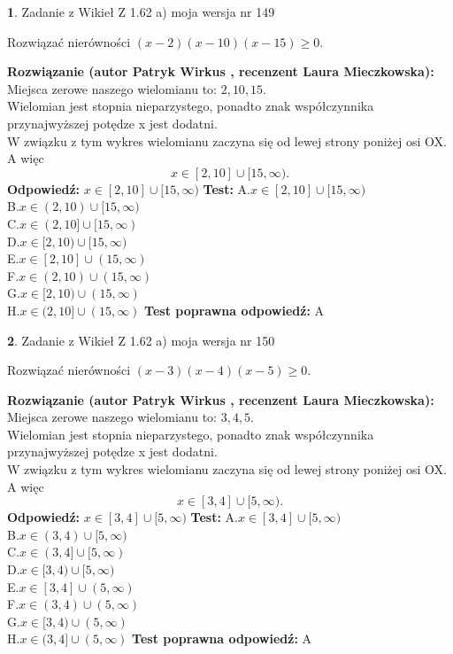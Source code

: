 \documentclass[12pt, a4paper]{article}
\theoremstyle{definition} %
\newtheorem{zad}{}
\newcommand{\zadStart}[1]{\begin{zad}#1\newline}
\newcommand{\zadStop}{\end{zad}}
\newcommand{\rozwStart}[2]{\noindent \textbf{Rozwiązanie (autor #1 , recenzent #2): }\newline}
\newcommand{\rozwStop}{\newline}
\newcommand{\odpStart}{\noindent \textbf{Odpowiedź:}\newline}
\newcommand{\odpStop}{\newline}
\newcommand{\testStart}{\noindent \textbf{Test:}\newline}
\newcommand{\testStop}{\newline}
\newcommand{\kluczStart}{\noindent \textbf{Test poprawna odpowiedź:}\newline}
\newcommand{\kluczStop}{\newline}
\begin{document}
\zadStart{Zadanie z Wikieł Z 1.62 a) moja wersja nr 149}

Rozwiązać nierówności $(x-2)(x-10)(x-15)\ge0$.
\zadStop
\rozwStart{Patryk Wirkus}{Laura Mieczkowska}
Miejsca zerowe naszego wielomianu to: $2, 10, 15$.\\
Wielomian jest stopnia nieparzystego, ponadto znak współczynnika przy\linebreak najwyższej potędze x jest dodatni.\\ W związku z tym wykres wielomianu zaczyna się od lewej strony poniżej osi OX. A więc $$x \in [2,10] \cup [15,\infty).$$
\rozwStop
\odpStart
$x \in [2,10] \cup [15,\infty)$
\odpStop
\testStart
A.$x \in [2,10] \cup [15,\infty)$\\
B.$x \in (2,10) \cup [15,\infty)$\\
C.$x \in (2,10] \cup [15,\infty)$\\
D.$x \in [2,10) \cup [15,\infty)$\\
E.$x \in [2,10] \cup (15,\infty)$\\
F.$x \in (2,10) \cup (15,\infty)$\\
G.$x \in [2,10) \cup (15,\infty)$\\
H.$x \in (2,10] \cup (15,\infty)$
\testStop
\kluczStart
A
\kluczStop



\zadStart{Zadanie z Wikieł Z 1.62 a) moja wersja nr 150}

Rozwiązać nierówności $(x-3)(x-4)(x-5)\ge0$.
\zadStop
\rozwStart{Patryk Wirkus}{Laura Mieczkowska}
Miejsca zerowe naszego wielomianu to: $3, 4, 5$.\\
Wielomian jest stopnia nieparzystego, ponadto znak współczynnika przy\linebreak najwyższej potędze x jest dodatni.\\ W związku z tym wykres wielomianu zaczyna się od lewej strony poniżej osi OX. A więc $$x \in [3,4] \cup [5,\infty).$$
\rozwStop
\odpStart
$x \in [3,4] \cup [5,\infty)$
\odpStop
\testStart
A.$x \in [3,4] \cup [5,\infty)$\\
B.$x \in (3,4) \cup [5,\infty)$\\
C.$x \in (3,4] \cup [5,\infty)$\\
D.$x \in [3,4) \cup [5,\infty)$\\
E.$x \in [3,4] \cup (5,\infty)$\\
F.$x \in (3,4) \cup (5,\infty)$\\
G.$x \in [3,4) \cup (5,\infty)$\\
H.$x \in (3,4] \cup (5,\infty)$
\testStop
\kluczStart
A
\kluczStop
\end{document}
